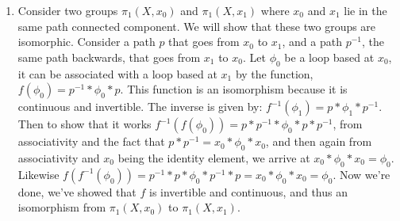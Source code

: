 \documentclass[12pt]{report}
\begin{document}
\begin{enumerate}
\item Consider two groups $\pi_1(X,x_0)$ and $\pi_1(X,x_1)$ where $x_0$ and $x_1$ lie in the same path connected
      component. We will show that these two groups are isomorphic. Consider a path $p$ that goes from $x_0$ to $x_1$,
      and a path $p^{-1}$, the same path backwards, that goes from $x_1$ to $x_0$. Let $\phi_0$ be a loop based at
      $x_0$, it can be associated with a loop based at $x_1$ by the function, $f(\phi_0) = p^{-1}*\phi_0*p$. This
      function is an isomorphism because it is continuous and invertible. The inverse is given by: $f^{-1}(\phi_1) =
      p*\phi_1*p^{-1}$. Then to show that it works $f^{-1}(f(\phi_0)) = p*p^{-1}*\phi_0*p*p^{-1}$, from associativity
      and the fact that $p*p^{-1} = x_0 * \phi_0 * x_0$, and then again from associativity and $x_0$ being the identity
      element, we arrive at $x_0 * \phi_0 * x_0 = \phi_0$. Likewise
      $f(f^{-1}(\phi_0)) = p^{-1}*p*\phi_0*p^{-1}*p = x_0 * \phi_0 * x_0 = \phi_0$. Now we're done, we've showed that
      $f$ is invertible and continuous, and thus an isomorphism from $\pi_1(X,x_0)$ to $\pi_1(X,x_1)$.
\end{enumerate}
\end{document}
